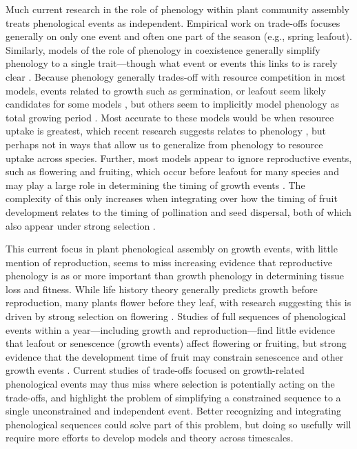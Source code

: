\documentclass[11pt]{article}
\begin{document}
Much current research in the role of phenology within plant community assembly treats phenological events as independent. Empirical work on trade-offs focuses generally on only one event and often one part of the season (e.g., spring leafout). Similarly, models of the role of phenology in coexistence generally simplify phenology to a single trait---though what event or events this links to is rarely clear \citep[even when studied with empirical data][]{godoy2014}. Because phenology generally trades-off with resource competition in most models, events related to growth such as germination, or leafout seem likely candidates for some models \citep[e.g.,][]{godoy2014,wolkovich2021phenological}, but others seem to implicitly model phenology as total growing period \citep{levine2022competition}. Most accurate to these models would be when resource uptake is greatest, which recent research suggests relates to phenology \citep{Heberling2013,heberling2019}, but perhaps not in ways that allow us to generalize from phenology to resource uptake across species. Further, most models appear to ignore reproductive events, such as flowering and fruiting, which occur before leafout for many species \citep{Primack:1987jz,dan2021nph} and may play a large role in determining the timing of growth events \citep{ettinger2018phenological}. The complexity of this only increases when integrating over how the timing of fruit development relates to the timing of pollination and seed dispersal, both of which also appear under strong selection \citep{whitehead1969wind}.

This current focus in plant phenological assembly on growth events, with little mention of reproduction, seems to miss increasing evidence that reproductive phenology is as or more important than growth phenology in determining tissue loss and fitness. While life history theory generally predicts growth before reproduction, many plants flower before they leaf, with research suggesting this is driven by strong selection on flowering \citep{dan2021nph}. Studies of full sequences of phenological events within a year---including growth and reproduction---find little evidence that leafout or senescence (growth events) affect flowering or fruiting, but strong evidence that the development time of fruit may constrain senescence and other growth events \citep{ettinger2018phenological}. Current studies of trade-offs focused on growth-related phenological events may thus miss where selection is potentially acting on the trade-offs, and highlight the problem of simplifying a constrained sequence to a single unconstrained and independent event. Better recognizing and integrating phenological sequences could solve part of this problem, but doing so usefully will require more efforts to develop models and theory across timescales. 
\end{document}
